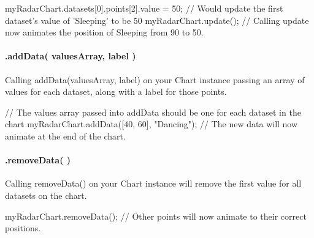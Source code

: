 \begin{DoxyCode}
myRadarChart.datasets[0].points[2].value = 50;
// Would update the first dataset's value of 'Sleeping' to be 50
myRadarChart.update();
// Calling update now animates the position of Sleeping from 90 to 50.
\end{DoxyCode}


\paragraph*{.add\+Data( values\+Array, label )}

Calling {\ttfamily add\+Data(values\+Array, label)} on your Chart instance passing an array of values for each dataset, along with a label for those points.


\begin{DoxyCode}
// The values array passed into addData should be one for each dataset in the chart
myRadarChart.addData([40, 60], "Dancing");
// The new data will now animate at the end of the chart.
\end{DoxyCode}


\paragraph*{.remove\+Data( )}

Calling {\ttfamily remove\+Data()} on your Chart instance will remove the first value for all datasets on the chart.


\begin{DoxyCode}
myRadarChart.removeData();
// Other points will now animate to their correct positions.
\end{DoxyCode}
 